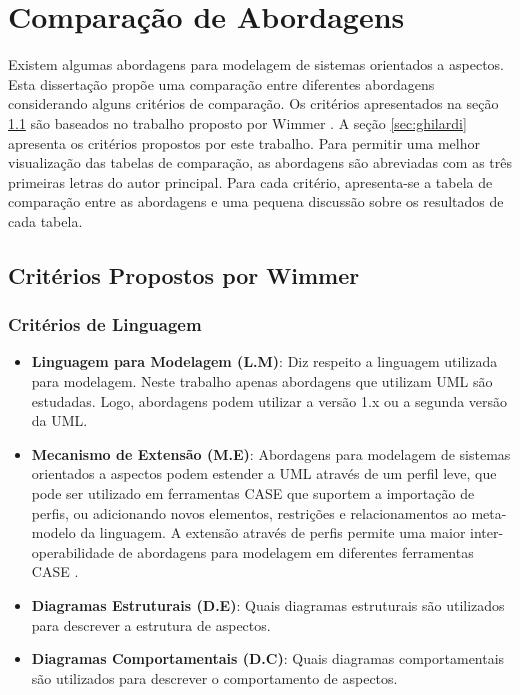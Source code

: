 \section{Comparação de Abordagens}

Existem algumas abordagens para modelagem de sistemas orientados a aspectos. Esta dissertação propõe uma comparação entre diferentes abordagens
considerando alguns critérios de comparação. Os critérios apresentados na seção \ref{sec:wimmer} são baseados no trabalho proposto por
Wimmer \cite{wimmer:2011:SUA:1978802.1978807}. A seção \ref{sec:ghilardi} apresenta os critérios propostos por este trabalho. Para permitir uma
melhor visualização das tabelas de comparação, as abordagens são abreviadas com as três primeiras letras do autor principal. 
Para cada critério, apresenta-se a tabela de comparação entre as abordagens e uma pequena discussão sobre os resultados de
cada tabela.

\subsection{Critérios Propostos por Wimmer}\label{sec:wimmer}

\subsubsection{Critérios de Linguagem}

\begin{itemize}
	\item \textbf{Linguagem para Modelagem (L.M)}: Diz respeito a linguagem utilizada para modelagem. Neste trabalho apenas abordagens que utilizam UML
	são estudadas. Logo, abordagens podem utilizar a versão 1.x ou a segunda versão da UML.
	\item \textbf{Mecanismo de Extensão (M.E)}: Abordagens para modelagem de sistemas orientados a aspectos podem estender a UML através de um perfil
	leve, que pode ser utilizado em ferramentas CASE que suportem a importação de perfis, ou adicionando novos elementos, restrições e relacionamentos ao
	meta-modelo da linguagem. A extensão através de perfis permite uma maior inter-operabilidade de abordagens para modelagem em diferentes ferramentas
	CASE \cite{Booch:2005:UML:1088874}.
	\item \textbf{Diagramas Estruturais (D.E)}: Quais diagramas estruturais são utilizados para descrever a estrutura de aspectos.
	\item \textbf{Diagramas Comportamentais (D.C)}: Quais diagramas comportamentais são utilizados para descrever o comportamento de aspectos.
\end{itemize}

